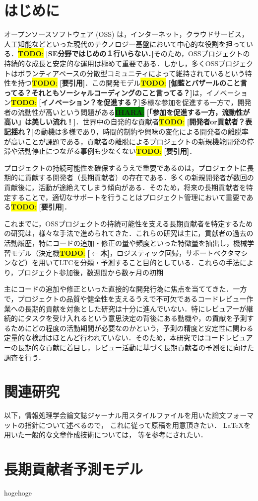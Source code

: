 \documentclass[submit,techrep,noauthor]{ipsj}
\newcommand{\todo}[1]{\colorbox{yellow}{{\bf TODO}:}{\color{red} {\textbf{[#1]}}}}
\newcommand{\ihara}[1]{\colorbox{green}{{\bf IHARA}:}{\color{blue} {\textbf{[#1]}}}}
\begin{document}
\section{はじめに}
オープンソースソフトウェア (OSS) は，インターネット，クラウドサービス，人工知能などといった現代のテクノロジー基盤において中心的な役割を担っている．\todo{SE分野ではじめの１行いらない．}そのため，OSSプロジェクトの持続的な成長と安定的な運用は極めて重要である．しかし，多くOSSプロジェクトはボランティアベースの分散型コミュニティによって維持されているという特性を持つ\todo{要引用}．この開発モデル\todo{伽藍とバザールのこと言ってる？それともソーシャルコーディングのこと言ってる？}は，イノベーション\todo{イノベーション？を促進する？}多様な参加を促進する一方で，開発者の流動性が高いという問題がある\ihara{「参加を促進する一方，流動性が高い」は美しい流れ！}．世界中の自発的な貢献者\todo{開発者or貢献者？表記揺れ？}の動機は多様であり，時間的制約や興味の変化による開発者の離脱率が高いことが課題である，貢献者の離脱によるプロジェクトの新規機能開発の停滞や活動停止につながる事例も少なくない\todo{要引用}．

プロジェクトの持続可能性を確保するうえで重要であるのは，プロジェクトに長期的に貢献する開発者（長期貢献者）の存在である．多くの新規開発者が数回の貢献後に，活動が途絶えてしまう傾向がある．そのため，将来の長期貢献者を特定することで，適切なサポートを行うことはプロジェクト管理において重要である\todo{要引用}．

これまでに，OSSプロジェクトの持続可能性を支える長期貢献者を特定するための研究は，様々な手法で進められてきた．これらの研究は主に，貢献者の過去の活動履歴，特にコードの追加・修正の量や頻度といった特徴量を抽出し，機械学習モデル（決定機\todo{$\leftarrow$木}，ロジスティック回帰，サポートベクタマシンなど）を用いてLTCを分類・予測すること目的としている．これらの手法により，プロジェクト参加後，数週間から数ヶ月の初期

主にコードの追加や修正といった直接的な開発行為に焦点を当ててきた．一方で，プロジェクトの品質や健全性を支えるうえで不可欠であるコードレビュー作業への長期的貢献を対象とした研究は十分に進んでいない．特にレビュアーが継続的にタスクを受け入れるという意思決定の背後にある動機や，の貢献を予測するためにどの程度の活動期間が必要なのかという，予測の精度と安定性に関わる定量的な検討はほとんど行われていない．そのため，本研究ではコードレビュアーの長期的な貢献に着目し，レビュー活動に基づく長期貢献者の予測をに向けた調査を行う．

\section{関連研究}
\label{sec:format}

以下，情報処理学会論文誌ジャーナル用スタイルファイルを用いた論文フォーマットの指針について述べるので，
これに従って原稿を用意頂きたい．
\LaTeX を用いた一般的な文章作成技術については，
\cite{okumura, companion} 等を参考にされたい．



\section{長期貢献者予測モデル}
\label{config}




\begin{acknowledgment}
hogehoge
\end{acknowledgment}




\end{document}
